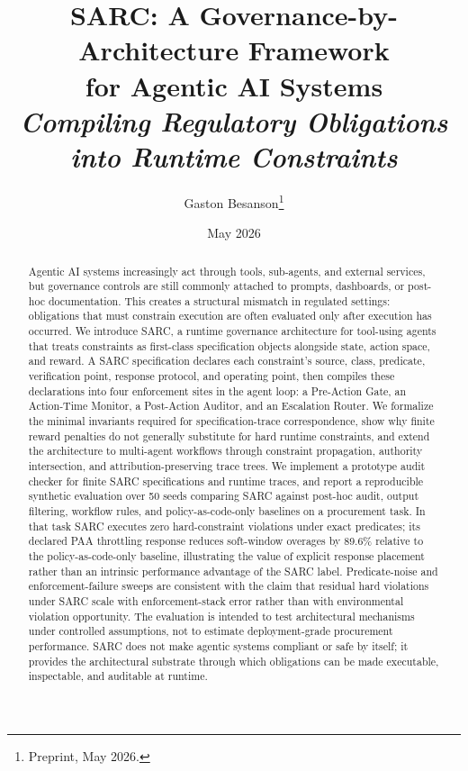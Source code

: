 \documentclass[11pt,a4paper]{article}
\title{\vspace{-1.5em}\color{accent}\textbf{SARC: A Governance-by-Architecture Framework\\ for Agentic AI Systems}\\[0.3em]\large\textit{Compiling Regulatory Obligations into Runtime Constraints}}
\author{Gaston Besanson\thanks{Preprint, May 2026.}}
\date{May 2026}
\theoremstyle{remark}
\begin{document}
\maketitle

\begin{abstract}
\noindent Agentic AI systems increasingly act through tools, sub-agents, and external services, but governance controls are still commonly attached to prompts, dashboards, or post-hoc documentation. This creates a structural mismatch in regulated settings: obligations that must constrain execution are often evaluated only after execution has occurred. We introduce SARC, a runtime governance architecture for tool-using agents that treats constraints as first-class specification objects alongside state, action space, and reward. A SARC specification declares each constraint's source, class, predicate, verification point, response protocol, and operating point, then compiles these declarations into four enforcement sites in the agent loop: a Pre-Action Gate, an Action-Time Monitor, a Post-Action Auditor, and an Escalation Router. We formalize the minimal invariants required for specification-trace correspondence, show why finite reward penalties do not generally substitute for hard runtime constraints, and extend the architecture to multi-agent workflows through constraint propagation, authority intersection, and attribution-preserving trace trees. We implement a prototype audit checker for finite SARC specifications and runtime traces, and report a reproducible synthetic evaluation over 50 seeds comparing SARC against post-hoc audit, output filtering, workflow rules, and policy-as-code-only baselines on a procurement task. In that task SARC executes zero hard-constraint violations under exact predicates; its declared PAA throttling response reduces soft-window overages by 89.6\% relative to the policy-as-code-only baseline, illustrating the value of explicit response placement rather than an intrinsic performance advantage of the SARC label. Predicate-noise and enforcement-failure sweeps are consistent with the claim that residual hard violations under SARC scale with enforcement-stack error rather than with environmental violation opportunity. The evaluation is intended to test architectural mechanisms under controlled assumptions, not to estimate deployment-grade procurement performance. SARC does not make agentic systems compliant or safe by itself; it provides the architectural substrate through which obligations can be made executable, inspectable, and auditable at runtime.
\end{abstract}
\end{document}
